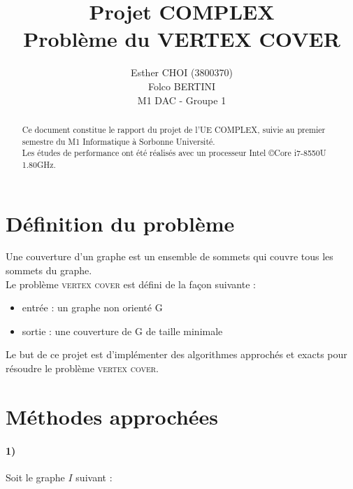 \documentclass[12pt]{article}
\title{Projet COMPLEX\\Problème du VERTEX COVER}
\author{Esther CHOI (3800370)\\Folco BERTINI\\M1 DAC - Groupe 1}
\begin{document}
\maketitle
\tableofcontents

\begin{abstract}
    Ce document constitue le rapport du projet de l'UE COMPLEX, suivie au premier semestre du M1 Informatique à Sorbonne Université. \\
    Les études de performance ont été réalisés avec un processeur Intel \copyright Core \texttrademark i7-8550U 1.80GHz. \\
\end{abstract}

\newpage

\section{Définition du problème}

    Une couverture d'un graphe est un ensemble de sommets qui couvre tous les sommets du graphe. \\
    Le problème \textsc{vertex cover} est défini de la façon suivante :

    \begin{itemize}
        \item entrée : un graphe non orienté G
        \item sortie : une couverture de G de taille minimale
    \end{itemize}

    Le but de ce projet est d'implémenter des algorithmes approchés et exacts pour résoudre le problème \textsc{vertex cover}.

\section{Méthodes approchées}

    \paragraph{1)}
        Soit le graphe $I$ suivant :
\end{document}
